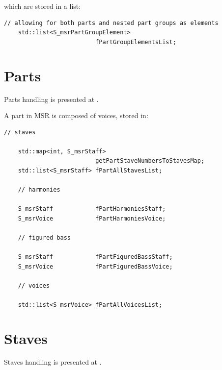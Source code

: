 which are stored in a list:
\begin{lstlisting}[language=CPlusPlus]
    // allowing for both parts and nested part groups as elements
    std::list<S_msrPartGroupElement>
                          fPartGroupElementsList;
\end{lstlisting}


\section{Parts}\label{Parts}

Parts handling is presented at .

A part in MSR is composed of voices, stored in:
\begin{lstlisting}[language=CPlusPlus]
    // staves

    std::map<int, S_msrStaff>
                          getPartStaveNumbersToStavesMap;
    std::list<S_msrStaff> fPartAllStavesList;

    // harmonies

    S_msrStaff            fPartHarmoniesStaff;
    S_msrVoice            fPartHarmoniesVoice;

    // figured bass

    S_msrStaff            fPartFiguredBassStaff;
    S_msrVoice            fPartFiguredBassVoice;

    // voices

    std::list<S_msrVoice> fPartAllVoicesList;
\end{lstlisting}


\section{Staves}\label{Staves}

Staves handling is presented at .

